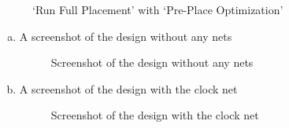\documentclass[a4paper,11pt]{article}%
\begin{document}
\begin{enumerate}[1.)]
	\begin{figure}[H]
		\centering
		\caption{`Run Full Placement' with `Pre-Place Optimization'}
		\label{fig:innovus_7_2}
	\end{figure}
	\pagebreak
	\begin{enumerate}[a.]
		\item A screenshot of the design without any nets
		\begin{figure}[H]
			\centering
			\caption{Screenshot of the design without any nets}
			\label{fig:innovus_9_2}
		\end{figure}
		
		\item A screenshot of the design with the clock net		
		\begin{figure}[H]
			\centering
			\caption{Screenshot of the design with the clock net}
			\label{fig:innovus_9_3}
		\end{figure}
	\end{enumerate}
	

\end{enumerate} 

\pagebreak
{\small


}
\end{document}
